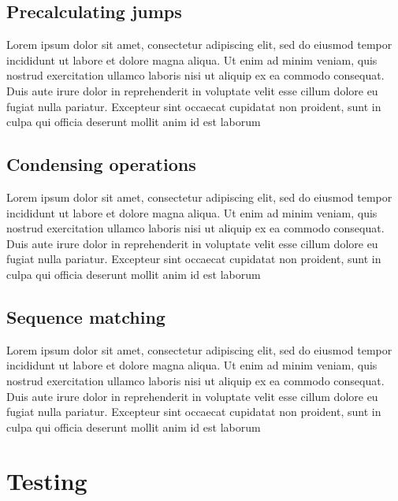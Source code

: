 \subsection{Precalculating jumps}
\label{subsec:ch2sec3sec1}

\par Lorem ipsum dolor sit amet, consectetur adipiscing elit, sed do eiusmod tempor incididunt ut labore et dolore magna aliqua. Ut enim ad minim veniam, quis nostrud exercitation ullamco laboris nisi ut aliquip ex ea commodo consequat. Duis aute irure dolor in reprehenderit in voluptate velit esse cillum dolore eu fugiat nulla pariatur. Excepteur sint occaecat cupidatat non proident, sunt in culpa qui officia deserunt mollit anim id est laborum

\subsection{Condensing operations}
\label{subsec:ch2sec3sec2}

\par Lorem ipsum dolor sit amet, consectetur adipiscing elit, sed do eiusmod tempor incididunt ut labore et dolore magna aliqua. Ut enim ad minim veniam, quis nostrud exercitation ullamco laboris nisi ut aliquip ex ea commodo consequat. Duis aute irure dolor in reprehenderit in voluptate velit esse cillum dolore eu fugiat nulla pariatur. Excepteur sint occaecat cupidatat non proident, sunt in culpa qui officia deserunt mollit anim id est laborum

\subsection{Sequence matching}
\label{subsec:ch2sec3sec3}

\par Lorem ipsum dolor sit amet, consectetur adipiscing elit, sed do eiusmod tempor incididunt ut labore et dolore magna aliqua. Ut enim ad minim veniam, quis nostrud exercitation ullamco laboris nisi ut aliquip ex ea commodo consequat. Duis aute irure dolor in reprehenderit in voluptate velit esse cillum dolore eu fugiat nulla pariatur. Excepteur sint occaecat cupidatat non proident, sunt in culpa qui officia deserunt mollit anim id est laborum

\section{Testing}
\label{sec:ch2sec4}